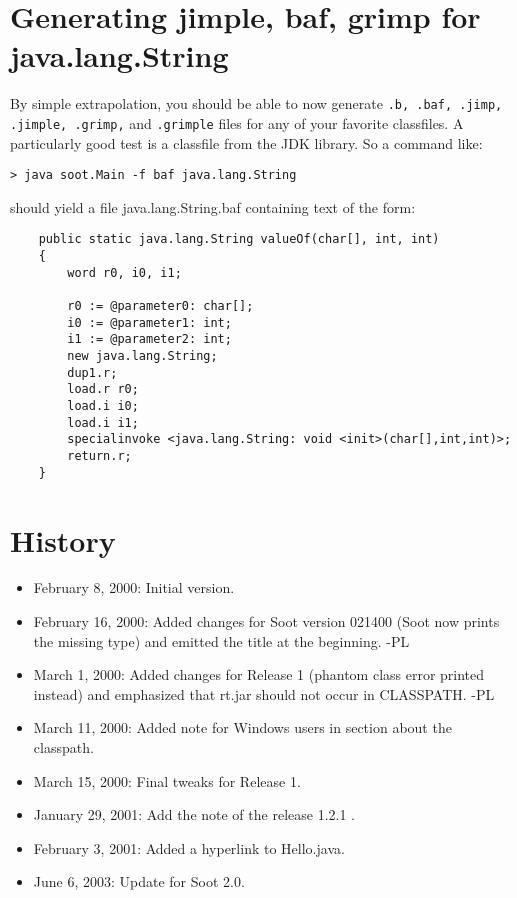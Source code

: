 \documentclass{article}
\begin{document}
\section{Generating jimple, baf, grimp for java.lang.String}

By simple extrapolation, you should be able to now generate {\tt .b, .baf,
.jimp, .jimple, .grimp,} and {\tt .grimple} files for any of your favorite
classfiles.  A particularly good test is a classfile from the JDK
library.  So a command like:

\begin{verbatim}
> java soot.Main -f baf java.lang.String
\end{verbatim}

should yield a file java.lang.String.baf containing text of the form:

\begin{verbatim}
    public static java.lang.String valueOf(char[], int, int)
    {
        word r0, i0, i1;

        r0 := @parameter0: char[];
        i0 := @parameter1: int;
        i1 := @parameter2: int;
        new java.lang.String;
        dup1.r;
        load.r r0;
        load.i i0;
        load.i i1;
        specialinvoke <java.lang.String: void <init>(char[],int,int)>;
        return.r;
    }
\end{verbatim}

\section{History}
\begin{itemize}
\item February 8, 2000: Initial version.

\item February 16, 2000: Added changes for Soot version 021400 (Soot now prints
the missing type) and emitted the title at the beginning. -PL

\item March 1, 2000: Added changes for Release 1 (phantom class error
printed instead) and emphasized that rt.jar should not occur in CLASSPATH. -PL

\item March 11, 2000: Added note for Windows users in section about the
classpath.

\item March 15, 2000: Final tweaks for Release 1.

\item January 29, 2001: Add the note of the release 1.2.1 .

\item February 3, 2001: Added a hyperlink to Hello.java.

\item June 6, 2003: Update for Soot 2.0.
\end{itemize}
\end{document}
